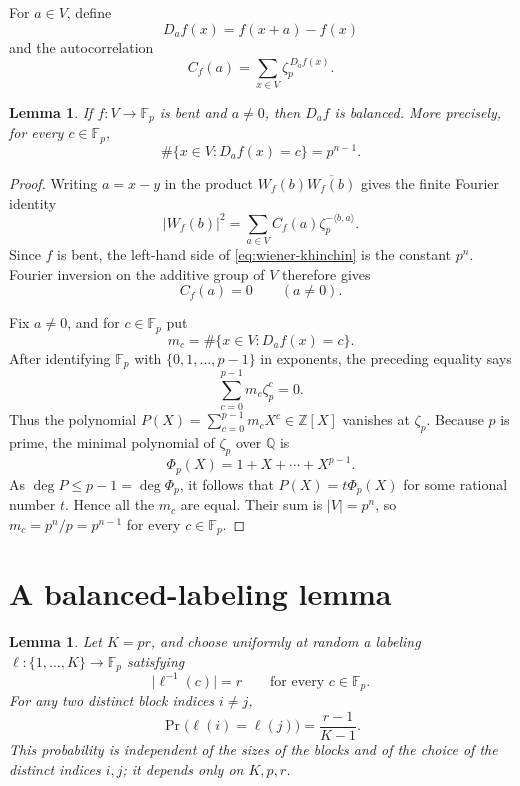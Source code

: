 \documentclass[11pt]{article}
\newtheorem{lemma}[theorem]{Lemma}
\theoremstyle{remark}
\newcommand{\F}{\mathbb F}
\newcommand{\zetaP}{\zeta_p}
\newcommand{\card}[1]{\lvert #1\rvert}
\newcommand{\ip}[2]{\langle #1,#2\rangle}
\begin{document}
For $a\in V$, define
\[
  D_a f(x)=f(x+a)-f(x)
\]
and the autocorrelation
\[
  C_f(a)=\sum_{x\in V}\zetaP^{\,D_a f(x)}.
\]

\begin{lemma}\label{lem:derivative}
If $f:V\to\F_p$ is bent and $a\ne0$, then $D_a f$ is balanced.  More
precisely, for every $c\in\F_p$,
\[
  \#\{x\in V:D_a f(x)=c\}=p^{n-1}.
\]
\end{lemma}

\begin{proof}
Writing $a=x-y$ in the product $W_f(b)\overline{W_f(b)}$ gives the
finite Fourier identity
\begin{equation}\label{eq:wiener-khinchin}
  \card{W_f(b)}^2
  =\sum_{a\in V} C_f(a)\zetaP^{-\ip{b}{a}}.
\end{equation}
Since $f$ is bent, the left-hand side of
\eqref{eq:wiener-khinchin} is the constant $p^n$.  Fourier inversion on
the additive group of $V$ therefore gives
\[
  C_f(a)=0\qquad(a\ne0).
\]

Fix $a\ne0$, and for $c\in\F_p$ put
\[
  m_c=\#\{x\in V:D_a f(x)=c\}.
\]
After identifying $\F_p$ with $\{0,1,\ldots,p-1\}$ in exponents, the
preceding equality says
\[
  \sum_{c=0}^{p-1}m_c\zetaP^c=0.
\]
Thus the polynomial $P(X)=\sum_{c=0}^{p-1}m_cX^c\in\mathbb Z[X]$
vanishes at $\zetaP$.  Because $p$ is prime, the minimal polynomial of
$\zetaP$ over $\mathbb Q$ is
\[
  \Phi_p(X)=1+X+\cdots+X^{p-1}.
\]
As $\deg P\le p-1=\deg\Phi_p$, it follows that
$P(X)=t\Phi_p(X)$ for some rational number $t$.  Hence all the $m_c$
are equal.  Their sum is $\card V=p^n$, so
$m_c=p^n/p=p^{n-1}$ for every $c\in\F_p$.
\end{proof}

\section{A balanced-labeling lemma}

\begin{lemma}\label{lem:balanced-labeling}
Let $K=pr$, and choose uniformly at random a labeling
$\ell:\{1,\ldots,K\}\to\F_p$ satisfying
\[
  \card{\ell^{-1}(c)}=r
  \qquad\text{for every }c\in\F_p.
\]
For any two distinct block indices $i\ne j$,
\[
  \Pr\bigl(\ell(i)=\ell(j)\bigr)=\frac{r-1}{K-1}.
\]
This probability is independent of the sizes of the blocks and of the
choice of the distinct indices $i,j$; it depends only on $K,p,r$.
\end{lemma}
\end{document}
